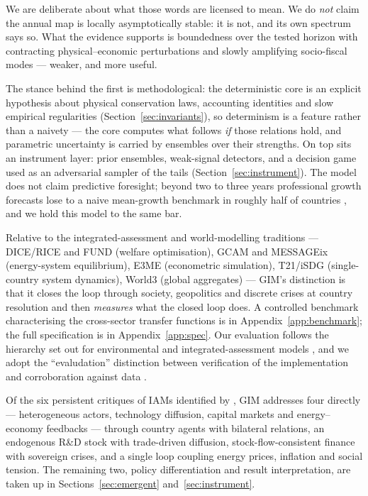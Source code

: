 \documentclass[12pt,a4paper]{article}
\begin{document}
We are deliberate about what those words are licensed to mean. We do \emph{not} claim the
annual map is locally asymptotically stable: it is not, and its own spectrum says so. What the
evidence supports is boundedness over the tested horizon with contracting physical--economic
perturbations and slowly amplifying socio-fiscal modes --- weaker, and more useful.

The stance behind the first is methodological: the deterministic core is an explicit hypothesis
about physical conservation laws, accounting identities and slow empirical regularities
(Section~\ref{sec:invariants}), so determinism is a feature rather than a naivety --- the core
computes what follows \emph{if} those relations hold, and parametric uncertainty is carried by
ensembles over their strengths. On top sits an instrument layer: prior ensembles, weak-signal
detectors, and a decision game used as an adversarial sampler of the tails
(Section~\ref{sec:instrument}). The model does not claim predictive foresight; beyond two to
three years professional growth forecasts lose to a naive mean-growth benchmark in roughly half
of countries \citep{celasun2021}, and we hold this model to the same bar.

Relative to the integrated-assessment and world-modelling traditions --- DICE/RICE
\citep{nordhaus2017,nordhausyang1996} and FUND \citep{anthoff2013} (welfare optimisation),
GCAM \citep{calvin2019} and MESSAGEix \citep{huppmann2019} (energy-system equilibrium), E3ME
\citep{mercure2018} (econometric simulation), T21/iSDG \citep{barney2002} (single-country
system dynamics), World3 \citep{meadows1972} (global aggregates) --- GIM's distinction is that
it closes the loop through society, geopolitics and discrete crises at country resolution and
then \emph{measures} what the closed loop does. A controlled benchmark characterising the
cross-sector transfer functions is in Appendix~\ref{app:benchmark}; the full specification is
in Appendix~\ref{app:spec}. Our evaluation follows the hierarchy set out for environmental and
integrated-assessment models \citep{jakeman2006,bennett2013,schwanitz2013,wilson2021}, and we
adopt the ``evaludation'' distinction between verification of the implementation and
corroboration against data \citep{augusiak2014,grimm2014trace}.

Of the six persistent critiques of IAMs identified by \citet{keppo2021}, GIM addresses four
directly --- heterogeneous actors, technology diffusion, capital markets and energy--economy
feedbacks --- through country agents with bilateral relations, an endogenous R\&D stock with
trade-driven diffusion, stock-flow-consistent finance with sovereign crises, and a single loop
coupling energy prices, inflation and social tension. The remaining two, policy differentiation
and result interpretation, are taken up in Sections~\ref{sec:emergent}
and~\ref{sec:instrument}.
\end{document}

